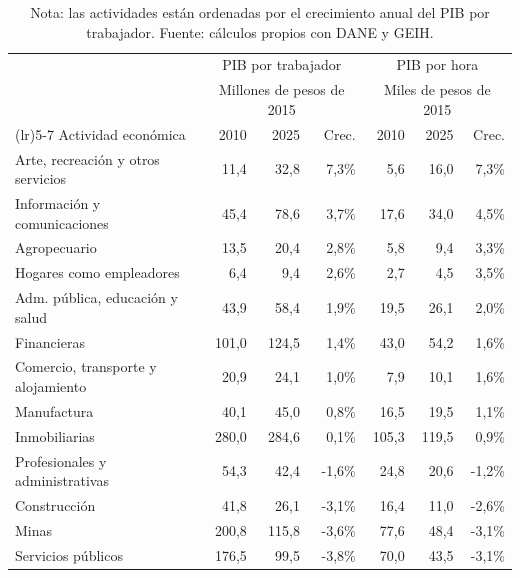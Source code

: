 \documentclass[11pt, a4paper]{article}
\begin{document}
\begin{table}[H]
\centering
\caption{Productividad laboral por actividad económica, 2010--2025}
\label{tab:comunicado_productividad_sector}
\setlength{\tabcolsep}{4pt}
\begin{tabular}{>{\raggedright\arraybackslash}p{5.4cm}rrrrrr}
\toprule
& \multicolumn{3}{c}{PIB por trabajador} & \multicolumn{3}{c}{PIB por hora} \\
& \multicolumn{3}{c}{Millones de pesos de 2015} & \multicolumn{3}{c}{Miles de pesos de 2015} \\
\cmidrule(lr){2-4}\cmidrule(lr){5-7}
Actividad económica & 2010 & 2025 & Crec. & 2010 & 2025 & Crec. \\
\midrule
Arte, recreación y otros servicios & 11,4 & 32,8 & 7,3\% & 5,6 & 16,0 & 7,3\% \\
Información y comunicaciones & 45,4 & 78,6 & 3,7\% & 17,6 & 34,0 & 4,5\% \\
Agropecuario & 13,5 & 20,4 & 2,8\% & 5,8 & 9,4 & 3,3\% \\
Hogares como empleadores & 6,4 & 9,4 & 2,6\% & 2,7 & 4,5 & 3,5\% \\
Adm. pública, educación y salud & 43,9 & 58,4 & 1,9\% & 19,5 & 26,1 & 2,0\% \\
Financieras & 101,0 & 124,5 & 1,4\% & 43,0 & 54,2 & 1,6\% \\
Comercio, transporte y alojamiento & 20,9 & 24,1 & 1,0\% & 7,9 & 10,1 & 1,6\% \\
Manufactura & 40,1 & 45,0 & 0,8\% & 16,5 & 19,5 & 1,1\% \\
Inmobiliarias & 280,0 & 284,6 & 0,1\% & 105,3 & 119,5 & 0,9\% \\
Profesionales y administrativas & 54,3 & 42,4 & -1,6\% & 24,8 & 20,6 & -1,2\% \\
Construcción & 41,8 & 26,1 & -3,1\% & 16,4 & 11,0 & -2,6\% \\
Minas & 200,8 & 115,8 & -3,6\% & 77,6 & 48,4 & -3,1\% \\
Servicios públicos & 176,5 & 99,5 & -3,8\% & 70,0 & 43,5 & -3,1\% \\
\bottomrule
\end{tabular}
\caption*{Nota: las actividades están ordenadas por el crecimiento anual del PIB por trabajador. Fuente: cálculos propios con DANE y GEIH.}
\end{table}

\end{document}
